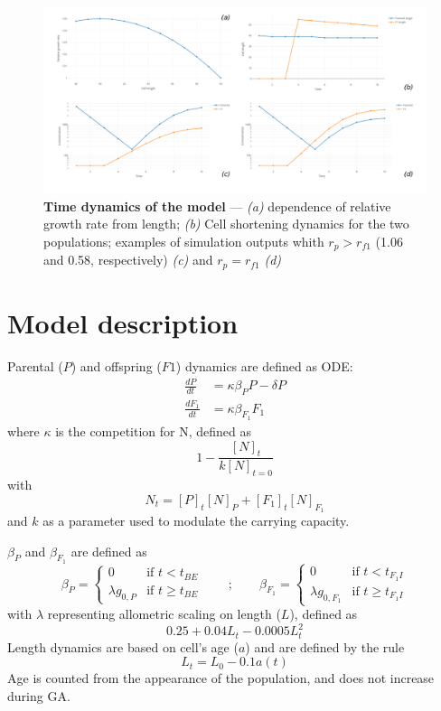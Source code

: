 \documentclass[a4paper,oneside]{book}
\begin{document}
    \begin{figure}[h]
      \includegraphics[width=\linewidth]{imgs/Figpan.pdf}
      \caption{\textbf{Time dynamics of the model} ---
      \textit{(a)} dependence of relative growth rate from length;
      \textit{(b)} Cell shortening dynamics for the two populations;
      examples of simulation outputs whith $r_{p} >r_{f1}$ (1.06 and 0.58, respectively) \textit{(c)} and $r_{p} = r_{f1}$ \textit{(d)}}\label{fdyn}
    \end{figure}
%
  \section*{Model description}
    Parental ($P$) and offspring ($F1$) dynamics are defined as ODE:\@
    \begin{align}
      \frac{dP}{dt}     &= \kappa \beta_{P}     P - \delta P \\
      \frac{dF_{1}}{dt} &= \kappa \beta_{F_{1}} F_{1}
    \end{align}
    where $\kappa$ is the competition for N, defined as
    \[
      1 - \frac{{[N]}_{t}}{k{[N]}_{t=0}}
    \]
    with 
    \[
      N_{t} = {[P]}_{t} {[N]}_{P} + {[F_{1}]}_{t} {[N]}_{F_{1}}
    \]
    and $k$ as a parameter used to modulate the carrying capacity.

    $\beta_{P}$  and $\beta_{F_{1}}$ are defined as
    \[
      \beta_{P} =
        \begin{cases}
          0               & \mbox{if } t < t_{BE} \\
          \lambda g_{0, P} & \mbox{if } t \geq t_{BE}
        \end{cases}
      \qquad;\qquad
      \beta_{F_{1}} = 
        \begin{cases}
          0                   & \mbox{if } t < t_{F_{1}I} \\
          \lambda g_{0, F_{1}} & \mbox{if } t \geq t_{F_{1}I}
        \end{cases}
    \]
    with $\lambda$ representing allometric scaling on length ($L$), defined as
    \[
      0.25 + 0.04 L_{t} - 0.0005 L_{t}^{2}
    \]
    Length dynamics are based on cell's age ($a$) and are defined by the rule
    \[
      L_{t} = L_{0} - 0.1 a(t)
    \]
    Age is counted from the appearance of the population, and does not increase during GA.\@
\end{document}

